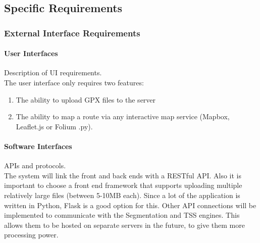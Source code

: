 \documentclass[11pt,twoside]{report}
\begin{document}
\subsection{Specific Requirements}
\subsubsection{External Interface Requirements}
\paragraph{User Interfaces} Description of UI requirements.\\
The user interface only requires two features:
\begin{enumerate}
	\item The ability to upload GPX files to the server
	\item The ability to map a route via any interactive map service (Mapbox, Leaflet.js or Folium \citep{folium}.py).
\end{enumerate}
\paragraph{Software Interfaces} APIs and protocols.\\
The system will link the front and back ends with a RESTful API. Also it is important to choose a front end framework
that supports uploading multiple relatively large files (between 5-10MB each). Since a lot of the application is written in Python,
Flask is a good option for this.
Other API connections will be implemented to communicate with the Segmentation and TSS engines. This allows them to be hosted on separate servers
in the future, to give them more processing power.
\end{document}

